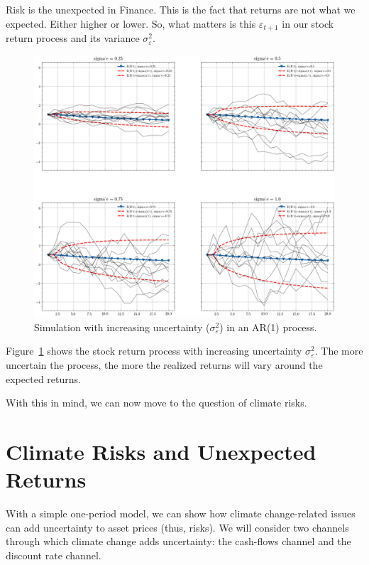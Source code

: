 Risk is the unexpected in Finance. This 
is the fact that returns are not 
what we expected. Either higher or lower.
So, what matters is this $\varepsilon_{t+1}$ in 
our stock return process and its variance $\sigma_{\varepsilon}^2$.

\begin{figure}[htbp]
    \centering
    \includegraphics[width=1\textwidth]{../images/chapter01/ar_1.png}
    \caption{Simulation with increasing 
    uncertainty ($\sigma_{\varepsilon}^2$) in an AR(1) process.}
    \label{fig:fig01}
\end{figure}

Figure~\ref{fig:fig01} shows the stock return process
with increasing uncertainty $\sigma_{\varepsilon}^2$.
The more uncertain the process, the more
the realized returns will vary around the
expected returns. 

With this in mind, we can now move to the question 
of climate risks. 

\section{Climate Risks and Unexpected Returns}

With a simple one-period model, we can
show how climate change-related issues can add uncertainty
to asset prices (thus, risks).
We will consider two channels through which
climate change adds uncertainty: the cash-flows channel
and the discount rate channel.

